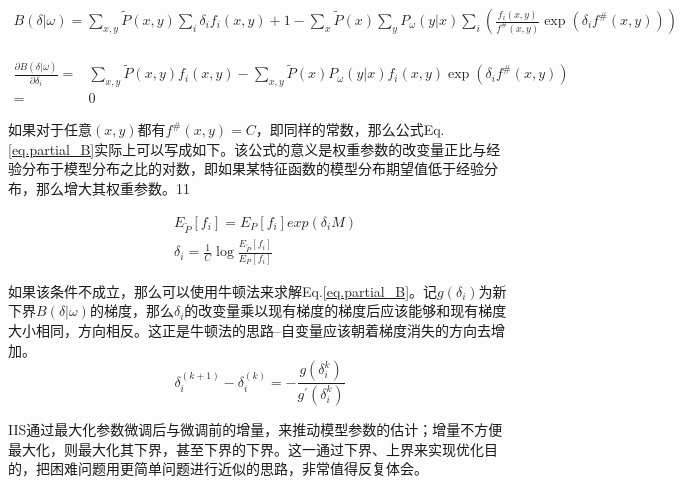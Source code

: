\documentclass{article}
\begin{document}
	 \begin{equation}
		\begin{aligned}
			B(\delta|\omega)
			=\sum_{x,y}\tilde{P}(x,y)\sum_{i}\delta_{i}f_{i}(x,y)+1-
			\sum_{x}\tilde{P}(x)\sum_{y}P_{\omega}(y|x)\sum_{i}(\frac{f_{i}(x,y)}{f^{\#}(x,y)}\exp{(\delta_{i}f^{\#}(x,y))})\\
		\end{aligned}     
     \end{equation}

	\begin{equation}
	  \begin{aligned}
	  \frac{\partial{B(\delta|\omega)}}{\partial{\delta_{i}}}=&\sum_{x,y}\tilde{P}(x,y)f_{i}(x,y)-\sum_{x,y}\tilde{P}(x)P_{\omega}(y|x)f_{i}(x,y)\exp{(\delta_{i}f^{\#}(x,y))}\\
			=&0 \label{eq.partial_B}
		\end{aligned}   
	\end{equation}  
  
     如果对于任意$(x,y)$都有$f^{\#}(x,y)=C$，即同样的常数，那么公式Eq.\ref{eq.partial_B}实际上可以写成如下。该公式的意义是权重参数的改变量正比与经验分布于模型分布之比的对数，即如果某特征函数的模型分布期望值低于经验分布，那么增大其权重参数。11
     
	\begin{equation}
		\begin{aligned}
			&E_{\tilde{P}}[f_{i}]=E_{P}[f_{i}]exp(\delta_{i}M) \\
			&\delta_{i}=\frac{1}{C}\log\frac{E_{\tilde{P}}[f_{i}]}{E_{P}[f_{i}]}
		\end{aligned}
	\end{equation}

    如果该条件不成立，那么可以使用牛顿法来求解Eq.\ref{eq.partial_B}。记$g(\delta_{i})$为新下界$B(\delta|\omega)$的梯度，那么$\delta_{i}$的改变量乘以现有梯度的梯度后应该能够和现有梯度大小相同，方向相反。这正是牛顿法的思路--自变量应该朝着梯度消失的方向去增加。
    \begin{equation}
    	{\delta_{i}^{(k+1)}}-{\delta_{i}^{(k)}}=-\frac{g(\delta_{i}^{k})}{g^{'}(\delta_{i}^{k})}
    \end{equation}

     IIS通过最大化参数微调后与微调前的增量，来推动模型参数的估计；增量不方便最大化，则最大化其下界，甚至下界的下界。这一通过下界、上界来实现优化目的，把困难问题用更简单问题进行近似的思路，非常值得反复体会。
      
   
\end{document}
